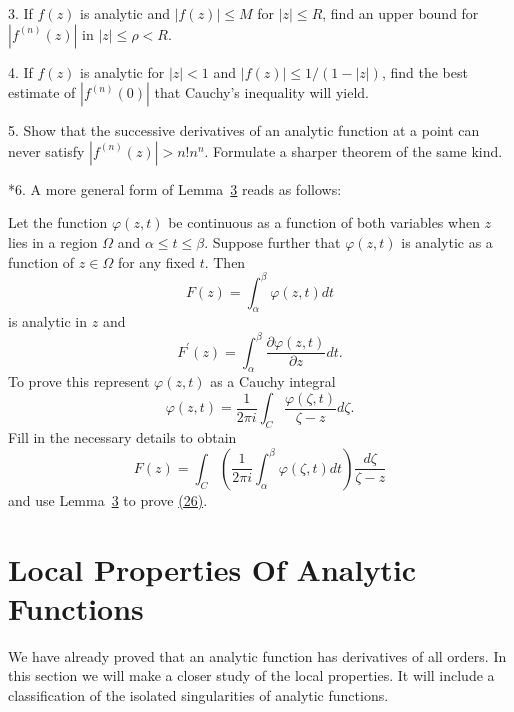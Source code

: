 3. If $f(z)$ is analytic and $|f(z)| \leq M$ for $|z| \leq R$, find an upper bound for $|f^{(n)}(z)|$ in $|z| \leq \rho < R$.

4. If $f(z)$ is analytic for $|z| < 1$ and $|f(z)| \leq 1 / (1 - |z|)$, find the best estimate of $|f^{(n)}(0)|$ that Cauchy's inequality will yield.

5. Show that the successive derivatives of an analytic function at a point can never satisfy $|f^{(n)}(z)| > n!n^{n}$. Formulate a sharper theorem of the same kind.

*6. A more general form of Lemma~\hyperref[lem:4.3]{3} reads as follows:

Let the function $\varphi(z,t)$ be continuous as a function of both variables when $z$ lies in a region $\Omega$ and $\alpha \leq t \leq \beta$. Suppose further that $\varphi(z,t)$ is analytic as a function of $z \in \Omega$ for any fixed $t$. Then
\begin{equation*}
F (z) = \int_ {\alpha} ^ {\beta} \varphi (z, t) d t
\end{equation*}
is analytic in $z$ and
\begin{equation*}
F ^ {\prime} (z) = \int_ {\alpha} ^ {\beta} \frac {\partial \varphi (z , t)}{\partial z} d t.\tag{26}\label{eq:4.26}
\end{equation*}
To prove this represent $\varphi(z,t)$ as a Cauchy integral
\begin{equation*}
\varphi (z, t) = \frac {1}{2 \pi i} \int_ {C} \frac {\varphi (\zeta , t)}{\zeta - z} d \zeta .
\end{equation*}
Fill in the necessary details to obtain
\begin{equation*}
F (z) = \int_ {C} \left(\frac {1}{2 \pi i} \int_ {\alpha} ^ {\beta} \varphi (\zeta , t) d t\right) \frac {d \zeta}{\zeta - z}
\end{equation*}
and use Lemma~\hyperref[lem:4.3]{3} to prove \hyperref[eq:4.26]{(26)}.


\setcounter{section}{2}\section{Local Properties Of Analytic Functions}\label{sec:4.3}
We have already proved that an analytic function has derivatives of all orders. In this section we will make a closer study of the local properties. It will include a classification of the isolated singularities of analytic functions.


